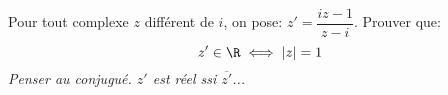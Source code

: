 \begin{exercice}

 Pour tout complexe $z$ diff\'erent de $i$, on pose:
  $z'=\dfrac{iz-1}{z-i}$. Prouver que:
\[ z'\in\R \iff |z|=1\]
\emph{Penser au conjugu\'e. $z'$ est r\'eel  ssi $\overline{z'}$...}
\end{exercice}
